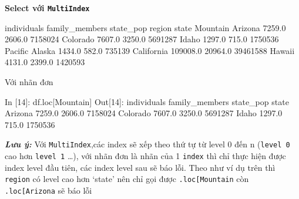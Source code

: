 \documentclass[
]{book}
\makeatletter
\newenvironment{Shaded}{\begin{snugshade}}{\end{snugshade}}
\newcommand{\DecValTok}[1]{\textcolor[rgb]{0.00,0.00,0.81}{#1}}
\newcommand{\FloatTok}[1]{\textcolor[rgb]{0.00,0.00,0.81}{#1}}
\newcommand{\NormalTok}[1]{#1}
\newcommand{\StringTok}[1]{\textcolor[rgb]{0.31,0.60,0.02}{#1}}
\newenvironment{kframe}{%
\medskip{}
\setlength{\fboxsep}{.8em}
 \def\at@end@of@kframe{}%
 \ifinner\ifhmode%
  \def\at@end@of@kframe{\end{minipage}}%
  \begin{minipage}{\columnwidth}%
 \fi\fi%
 \def\FrameCommand##1{\hskip\@totalleftmargin \hskip-\fboxsep
 \colorbox{shadecolor}{##1}\hskip-\fboxsep
     \hskip-\linewidth \hskip-\@totalleftmargin \hskip\columnwidth}%
 \MakeFramed {\advance\hsize-\width
   \@totalleftmargin\z@ \linewidth\hsize
   \@setminipage}}%
 {\par\unskip\endMakeFramed%
 \at@end@of@kframe}
\newenvironment{rmdblock}[1]
  {
  \begin{itemize}
  \renewcommand{\labelitemi}{
    \raisebox{-.7\height}[0pt][0pt]{
      {\setkeys{Gin}{width=3em,keepaspectratio}\texttt{[image: images/\#1]}}
    }
  }
  \setlength{\fboxsep}{1em}
  \begin{kframe}
  \item
  }
  {
  \end{kframe}
  \end{itemize}
  }
\newenvironment{rmdnote}
  {\begin{rmdblock}{note}}
  {\end{rmdblock}}
\makeatother
\begin{document}
\textbf{Select với \texttt{MultiIndex}}

\begin{Shaded}
\begin{Highlighting}[]
\NormalTok{                     individuals  family\_members  state\_pop}
\NormalTok{region   state                                             }
\NormalTok{Mountain Arizona          }\FloatTok{7259.0}          \FloatTok{2606.0}    \DecValTok{7158024}
\NormalTok{         Colorado         }\FloatTok{7607.0}          \FloatTok{3250.0}    \DecValTok{5691287}
\NormalTok{         Idaho            }\FloatTok{1297.0}           \FloatTok{715.0}    \DecValTok{1750536}
\NormalTok{Pacific  Alaska           }\FloatTok{1434.0}           \FloatTok{582.0}     \DecValTok{735139}
\NormalTok{         California     }\FloatTok{109008.0}         \FloatTok{20964.0}   \DecValTok{39461588}
\NormalTok{         Hawaii           }\FloatTok{4131.0}          \FloatTok{2399.0}    \DecValTok{1420593}
\end{Highlighting}
\end{Shaded}

Với nhãn đơn

\begin{Shaded}
\begin{Highlighting}[]
\NormalTok{In [}\DecValTok{14}\NormalTok{]: df.loc[}\StringTok{\textquotesingle{}Mountain\textquotesingle{}}\NormalTok{]}
\NormalTok{Out[}\DecValTok{14}\NormalTok{]: }
\NormalTok{          individuals  family\_members  state\_pop}
\NormalTok{state                                           }
\NormalTok{Arizona        }\FloatTok{7259.0}          \FloatTok{2606.0}    \DecValTok{7158024}
\NormalTok{Colorado       }\FloatTok{7607.0}          \FloatTok{3250.0}    \DecValTok{5691287}
\NormalTok{Idaho          }\FloatTok{1297.0}           \FloatTok{715.0}    \DecValTok{1750536}
\end{Highlighting}
\end{Shaded}

\begin{rmdnote}
\textbf{\emph{Lưu ý:}}
Với \texttt{MultiIndex},các index sẽ xếp theo thứ tự từ level 0 đến n (\texttt{level\ 0} cao hơn \texttt{level\ 1} \ldots), với nhãn đơn là nhãn của 1 \texttt{index} thì chỉ thực hiện được index level đầu tiên, các index level sau sẽ báo lỗi.
Theo như ví dụ trên thì \texttt{region} có level cao hơn `state' nên chỉ gọi được \texttt{.loc{[}\textquotesingle{}Mountain\textquotesingle{}{]}} còn \texttt{.loc{[}\textquotesingle{}Arizona\textquotesingle{}{]}} sẽ báo lỗi
\end{rmdnote}
\end{document}
